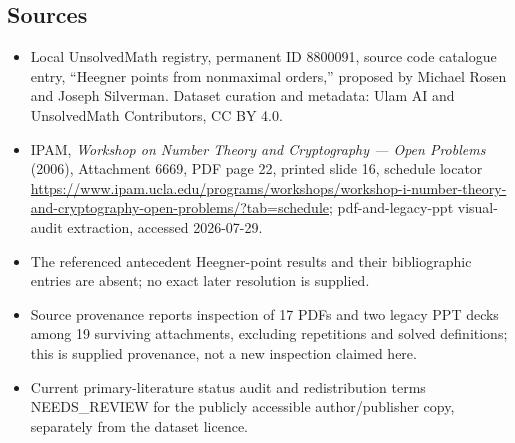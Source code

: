 \documentclass[11pt]{article}
\begin{document}
\subsection{Sources}
\begin{itemize}
\item Local UnsolvedMath registry, permanent ID 8800091, source code catalogue entry, ``Heegner points from nonmaximal orders,'' proposed by Michael Rosen and Joseph Silverman. Dataset curation and metadata: Ulam AI and UnsolvedMath Contributors, CC BY 4.0.
\item IPAM, \emph{Workshop on Number Theory and Cryptography --- Open Problems} (2006), Attachment 6669, PDF page 22, printed slide 16, schedule locator \url{https://www.ipam.ucla.edu/programs/workshops/workshop-i-number-theory-and-cryptography-open-problems/?tab=schedule}; pdf-and-legacy-ppt visual-audit extraction, accessed 2026-07-29.
\item The referenced antecedent Heegner-point results and their bibliographic entries are absent; no exact later resolution is supplied.
\item Source provenance reports inspection of 17 PDFs and two legacy PPT decks among 19 surviving attachments, excluding repetitions and solved definitions; this is supplied provenance, not a new inspection claimed here.
\item Current primary-literature status audit and redistribution terms NEEDS\_REVIEW for the publicly accessible author/publisher copy, separately from the dataset licence.
\end{itemize}
\end{document}
